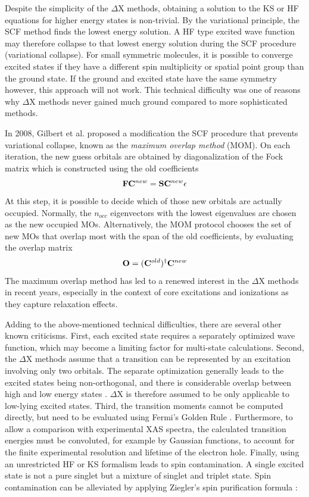 Despite the simplicity of the $\Delta$X methods, obtaining a solution to the KS or HF equations for higher energy states is non-trivial. By the variational principle, the SCF method finds the lowest energy solution. A HF type excited wave function may therefore collapse to that lowest energy solution during the SCF procedure (variational collapse). For small symmetric molecules, it is possible to converge excited states if they have a different spin multiplicity or spatial point group than the ground state. If the ground and excited state have the same symmetry however, this approach will not work. This technical difficulty was one of reasons why $\Delta$X methods never gained much ground compared to more sophisticated methods.

In 2008, Gilbert et al. \cite{Gil2008} proposed a modification the SCF procedure that prevents variational collapse, known as the \emph{maximum overlap method} (MOM). On each iteration, the new guess orbitals are obtained by diagonalization of the Fock matrix which is constructed using the old coefficients
\begin{equation}
\mathbf{F}\mathbf{C}^{new} = \mathbf{S}\mathbf{C}^{new}\epsilon
\end{equation}
\noindent At this step, it is possible to decide which of those new orbitals are actually occupied. Normally, the $n_{occ}$ eigenvectors with the lowest eigenvalues are chosen as the new occupied MOs. Alternatively, the MOM protocol chooses the set of new MOs that overlap most with the span of the old coefficients, by evaluating the overlap matrix
\begin{equation}
\mathbf{O} = (\mathbf{C}^{old})^{\dagger} \mathbf{C}^{new}
\end{equation}
\noindent The maximum overlap method has led to a renewed interest in the $\Delta$X methods in recent years, especially in the context of core excitations and ionizations as they capture relaxation effects.

Adding to the above-mentioned technical difficulties, there are several other known criticisms. First, each excited state requires a separately optimized wave function, which may become a limiting factor for multi-state calculations. Second, the $\Delta$X methods assume that a transition can be represented by an excitation involving only two orbitals. The separate optimization generally leads to the excited states being non-orthogonal, and there is considerable overlap between high and low energy states \cite{Dav1964,Dav1965,Gil2008}. $\Delta$X is therefore assumed to be only applicable to low-lying excited states. Third, the transition moments cannot be computed directly, but need to be evaluated using Fermi's Golden Rule \cite{Gro2008}. Furthermore, to allow a comparison with experimental XAS spectra, the calculated transition energies must be convoluted, for example by Gaussian functions, to 
account for the finite experimental resolution and  lifetime of the electron hole. Finally, using an unrestricted HF or KS formalism leads to spin contamination. A single excited state is not a pure singlet but a mixture of singlet and triplet state. Spin contamination can be alleviated by applying Ziegler's spin purification formula \cite{Zie1977}:

